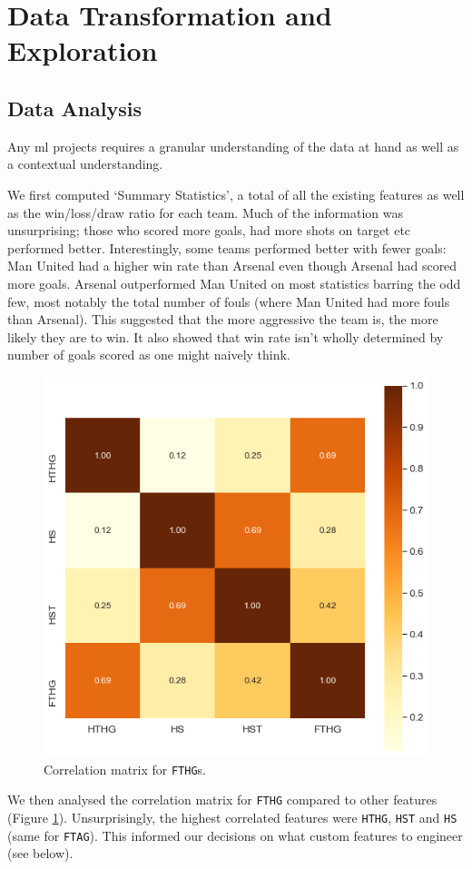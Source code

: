 \documentclass{article}
\newcommand{\sw}[1]{\texttt{#1}}
\begin{document}
\section{Data Transformation and Exploration}
\label{data}
\subsection{Data Analysis}
\label{analysis}
Any \gls{ml} projects requires a granular understanding of the data at hand as well as a contextual understanding. 

We first computed ‘Summary Statistics’, a total of all the existing features as well as the win/loss/draw ratio for each team. Much of the information was unsurprising; those who scored more goals, had more shots on target etc performed better. Interestingly, some teams performed better with fewer goals: Man United had a higher win rate than Arsenal even though Arsenal had scored more goals. Arsenal outperformed Man United on most statistics barring the odd few, most notably the total number of fouls (where Man United had more fouls than Arsenal). This suggested that the more aggressive the team is, the more likely they are to win. It also showed that win rate isn’t wholly determined by number of goals scored as one might naively think. 

\begin{figure}[!htb]
    \centering
    \includegraphics[width=0.5\linewidth]{Images/Figure 1.png}
    \caption{Correlation matrix for \sw{FTHG}s.}
    \label{fig:correlationmatrix}
\end{figure}

We then analysed the correlation matrix for \sw{FTHG} compared to other features (Figure \ref{fig:correlationmatrix}). Unsurprisingly, the highest correlated features were \sw{HTHG}, \sw{HST} and \sw{HS} (same for \sw{FTAG}). This informed our decisions on what custom features to engineer (see below).
\end{document}
